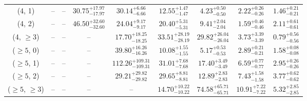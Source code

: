 \begin{table}[h!]
{\begin{tabular}{ccccccccc}
	(4, 1) & -- & -- & $30.75^{+ 17.97 }_{- 17.97 }$ & $30.14^{+ 6.66 }_{- 6.66 }$ & $12.55^{+ 1.47 }_{- 1.47 }$ & $4.23^{+ 0.50 }_{- 0.50 }$ & $2.22^{+ 0.26 }_{- 0.26 }$ & $1.46^{+ 0.21 }_{- 0.21 }$ \\[0.5ex] 
	(4, 2) & -- & -- & $46.50^{+ 32.60 }_{- 32.60 }$ & $24.04^{+ 9.17 }_{- 9.17 }$ & $20.40^{+ 5.31 }_{- 5.31 }$ & $9.41^{+ 2.04 }_{- 2.04 }$ & $1.59^{+ 0.46 }_{- 0.46 }$ & $2.11^{+ 0.61 }_{- 0.61 }$ \\[0.5ex] 
	(4, $\ge3$) & -- & -- & -- & $17.70^{+ 18.25 }_{- 18.25 }$ & $33.51^{+ 28.19 }_{- 28.19 }$ & $29.82^{+ 26.04 }_{- 26.04 }$ & $3.73^{+ 3.39 }_{- 3.39 }$ & $0.79^{+ 0.56 }_{- 0.56 }$ \\[0.5ex] 
	($\ge5$, 0) & -- & -- & -- & $39.80^{+ 16.26 }_{- 16.26 }$ & $10.08^{+ 1.55 }_{- 1.55 }$ & $5.17^{+ 0.53 }_{- 0.53 }$ & $2.89^{+ 0.21 }_{- 0.21 }$ & $1.58^{+ 0.08 }_{- 0.08 }$ \\[0.5ex] 
	($\ge5$, 1) & -- & -- & -- & $112.26^{+ 109.31 }_{- 109.31 }$ & $31.01^{+ 7.68 }_{- 7.68 }$ & $17.40^{+ 3.49 }_{- 3.49 }$ & $6.59^{+ 0.77 }_{- 0.77 }$ & $2.95^{+ 0.26 }_{- 0.26 }$ \\[0.5ex] 
	($\ge5$, 2) & -- & -- & -- & $29.21^{+ 29.82 }_{- 29.82 }$ & $29.65^{+ 8.81 }_{- 8.81 }$ & $12.89^{+ 2.83 }_{- 2.83 }$ & $7.43^{+ 1.58 }_{- 1.58 }$ & $3.77^{+ 0.62 }_{- 0.62 }$ \\[0.5ex] 
	($\ge5$, $\ge3$) & -- & -- & -- & -- & $14.70^{+ 10.22 }_{- 10.22 }$ & $74.58^{+ 65.71 }_{- 65.71 }$ & $10.91^{+ 7.22 }_{- 7.22 }$ & $5.32^{+ 2.85 }_{- 2.85 }$ \\[0.5ex] 
	\hline
	\hline
\end{tabular}}
\end{table}
